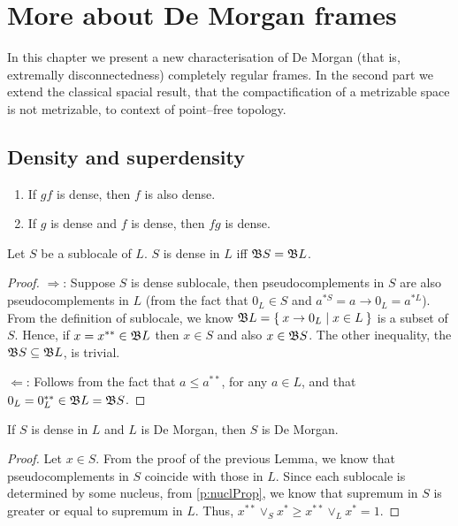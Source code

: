 \chapter{More about De Morgan frames}

In this chapter we present a new characterisation of De Morgan (that is, extremally disconnectedness) completely regular frames.
In the second part we extend the classical spacial result, that the compactification of a metrizable space is not metrizable, to context of point--free topology.

\section{Density and superdensity}

\begin{observation}\label{p:denseProperties}
    \begin{enumerate}
        \item If $gf$ is dense, then $f$ is also dense.
        \item If $g$ is dense and $f$ is dense, then $fg$ is dense.
    \end{enumerate}
\end{observation}

\begin{lemma}\label{p:denseProperties2}
    Let $S$ be a sublocale of $L$. $S$ is dense in $L$ iff $\mathfrak{B} S = \mathfrak{B} L$.
\end{lemma}
\begin{proof}
    $\Rightarrow$: Suppose $S$ is dense sublocale, then pseudocomplements in $S$ are also pseudocomplements in $L$ (from the fact that $0_L\in S$ and $a^{*S} = a\to 0_L = a^{*L}$).
    From the definition of sublocale, we know $\mathfrak{B} L = \Set{ x\to 0_L | x\in L}$ is a subset of $S$. Hence, if $x = x^{**}\in \mathfrak{B} L$ then $x \in S$ and also $x \in \mathfrak{B} S$. The other inequality, the $\mathfrak{B} S\subseteq \mathfrak{B} L$, is trivial.

    $\Leftarrow$: Follows from the fact that $a\leq a^{**}$, for any $a\in L$, and that $0_L = 0_L^{**} \in \mathfrak{B} L = \mathfrak{B} S$.
\end{proof}

\begin{proposition}\label{p:denseReflectDeMorgan}
    If $S$ is dense in $L$ and $L$ is De Morgan, then $S$ is De Morgan.
\end{proposition}
\begin{proof}
    Let $x\in S$. From the proof of the previous Lemma, we know that pseudocomplements in $S$ coincide with those in $L$. Since each sublocale is determined by some nucleus, from \ref{p:nuclProp}, we know that supremum in $S$ is greater or equal to supremum in $L$. Thus, $x^{**}\vee_S x^* \geq x^{**}\vee_L x^* = 1$.
\end{proof}

